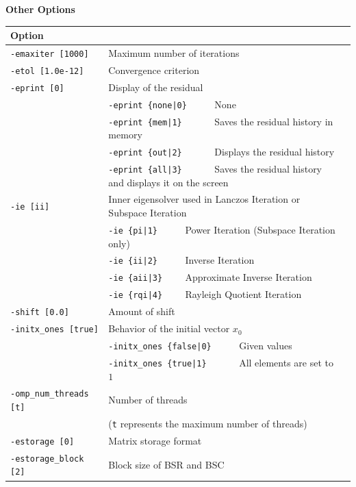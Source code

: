 \documentclass[a4paper]{article}
\begin{document}
\begin{minipage}[t]{\textwidth}
\begin{center}
{\bf Other Options}\\
\begin{tabular}{l|ll}\hline\hline
Option &                          \\ \hline
\verb=-emaxiter [1000]= & Maximum number of iterations         \\ 
\verb=-etol [1.0e-12]=  & Convergence criterion              \\
\verb=-eprint [0]=      & Display of the residual                 \\
                       & \verb=-eprint {none|0}     =  None \\
                       & \verb=-eprint {mem|1}      =  Saves the residual history in memory\\
                       & \verb=-eprint {out|2}      =  Displays the residual history\\
                       & \verb=-eprint {all|3}      =  Saves the residual history and displays it on the screen\\
\verb=-ie [ii]= & Inner eigensolver used in Lanczos Iteration or Subspace Iteration\\
                       & \verb=-ie {pi|1}     =  Power Iteration (Subspace Iteration only) \\
                       & \verb=-ie {ii|2}     =  Inverse Iteration \\
                       & \verb=-ie {aii|3}    =  Approximate Inverse Iteration \\
                       & \verb=-ie {rqi|4}    =  Rayleigh Quotient Iteration \\
\verb=-shift [0.0]= & Amount of shift  \\
\verb=-initx_ones [true]= & Behavior of the initial vector $x_{0}$  \\
                       & \verb=-initx_ones {false|0}     =  Given values \\
                       & \verb=-initx_ones {true|1}      =  All elements are set to $1$ \\
\verb=-omp_num_threads [t]= & Number of threads        \\ 
                            & (\verb=t= represents the maximum number of threads) \\
\verb=-estorage [0]=   & Matrix storage format \\
\verb=-estorage_block [2]=& Block size of BSR and BSC\\ 
\hline         
\end{tabular}
\end{center}
\end{minipage}
\end{document}
